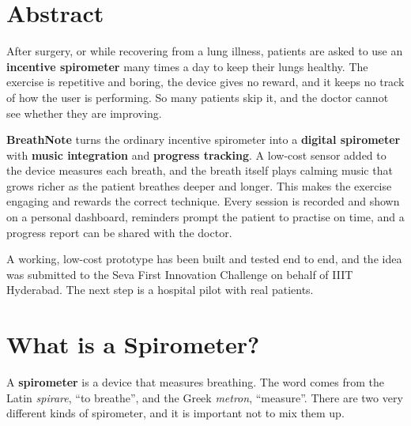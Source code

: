 \documentclass[12pt,a4paper]{article}
\begin{document}
\section*{Abstract}

After surgery, or while recovering from a lung illness, patients are asked to use an \textbf{incentive spirometer} many times a day to keep their lungs healthy. The exercise is repetitive and boring, the device gives no reward, and it keeps no track of how the user is performing. So many patients skip it, and the doctor cannot see whether they are improving.

\textbf{BreathNote} turns the ordinary incentive spirometer into a \textbf{digital spirometer} with \textbf{music integration} and \textbf{progress tracking}. A low-cost sensor added to the device measures each breath, and the breath itself plays calming music that grows richer as the patient breathes deeper and longer. This makes the exercise engaging and rewards the correct technique. Every session is recorded and shown on a personal dashboard, reminders prompt the patient to practise on time, and a progress report can be shared with the doctor.

A working, low-cost prototype has been built and tested end to end, and the idea was submitted to the Seva First Innovation Challenge on behalf of IIIT Hyderabad. The next step is a hospital pilot with real patients.

\section{What is a Spirometer?}
\label{sec:what}

A \textbf{spirometer} is a device that measures breathing. The word comes from the Latin \emph{spirare}, ``to breathe'', and the Greek \emph{metron}, ``measure''. There are two very different kinds of spirometer, and it is important not to mix them up.
\end{document}
